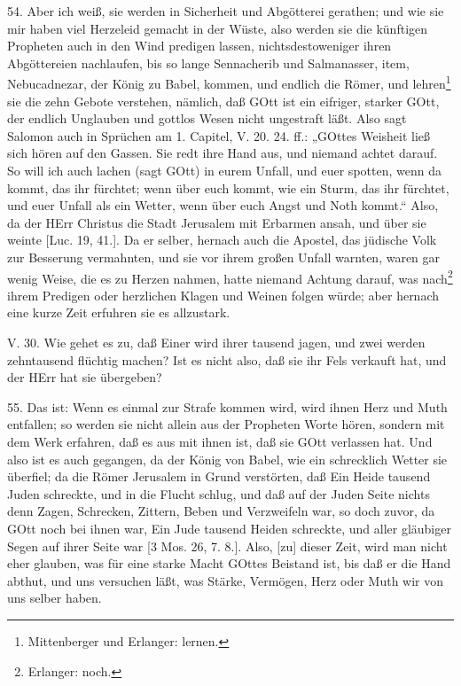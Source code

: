 54. Aber ich weiß, sie werden in Sicherheit und Abgötterei gerathen; und wie sie mir haben viel Herzeleid gemacht in der Wüste, also werden sie die künftigen Propheten auch in den Wind predigen lassen, nichtsdestoweniger ihren Abgöttereien nachlaufen, bis so lange Sennacherib und Salmanasser, item, Nebucadnezar, der König zu Babel, kommen, und endlich die Römer, und lehren\footnote{Mittenberger und Erlanger: lernen.} sie die zehn Gebote verstehen, nämlich, daß GOtt ist ein eifriger, starker GOtt, der endlich Unglauben und gottlos Wesen nicht ungestraft läßt. Also sagt Salomon auch in Sprüchen am 1. Capitel, V. 20. 24. ff.: „GOttes Weisheit ließ sich hören auf den Gassen. Sie redt ihre Hand aus, und niemand achtet darauf. So will ich auch lachen (sagt GOtt) in eurem Unfall, und euer spotten, wenn da kommt, das ihr fürchtet; wenn über euch kommt, wie ein Sturm, das ihr fürchtet, und euer Unfall als ein Wetter, wenn über euch Angst und Noth kommt.“ Also, da der HErr Christus die Stadt Jerusalem mit Erbarmen ansah, und über sie weinte [Luc. 19, 41.]. Da er selber, hernach auch die Apostel, das jüdische Volk zur Besserung vermahnten, und sie vor ihrem großen Unfall warnten, waren gar wenig Weise, die es zu Herzen nahmen, hatte niemand Achtung darauf, was nach\footnote{Erlanger: noch.} ihrem Predigen oder herzlichen Klagen und Weinen folgen würde; aber hernach eine kurze Zeit erfuhren sie es allzustark.

\begin{schriftzitat}
V. 30. Wie gehet es zu, daß Einer wird ihrer tausend jagen, und zwei werden zehntausend flüchtig machen? Ist es nicht also, daß sie ihr Fels verkauft hat, und der HErr hat sie übergeben?
\end{schriftzitat}

55. Das ist: Wenn es einmal zur Strafe kommen wird, wird ihnen Herz und Muth entfallen; so werden sie nicht allein aus der Propheten Worte hören, sondern mit dem Werk erfahren, daß es aus mit ihnen ist, daß sie GOtt verlassen hat. Und also ist es auch gegangen, da der König von Babel, wie ein schrecklich Wetter sie überfiel; da die Römer Jerusalem in Grund verstörten, daß Ein Heide tausend Juden schreckte, und in die Flucht schlug, und daß auf der Juden Seite nichts denn Zagen, Schrecken, Zittern, Beben und Verzweifeln war, so doch zuvor, da GOtt noch bei ihnen war, Ein Jude tausend Heiden schreckte, und aller gläubiger Segen auf ihrer Seite war [3 Mos. 26, 7. 8.]. Also, [zu]
dieser Zeit, wird man nicht eher glauben, was für eine starke Macht GOttes Beistand ist, bis daß er die Hand abthut, und uns versuchen läßt, was Stärke, Vermögen, Herz oder Muth wir von uns selber haben.

